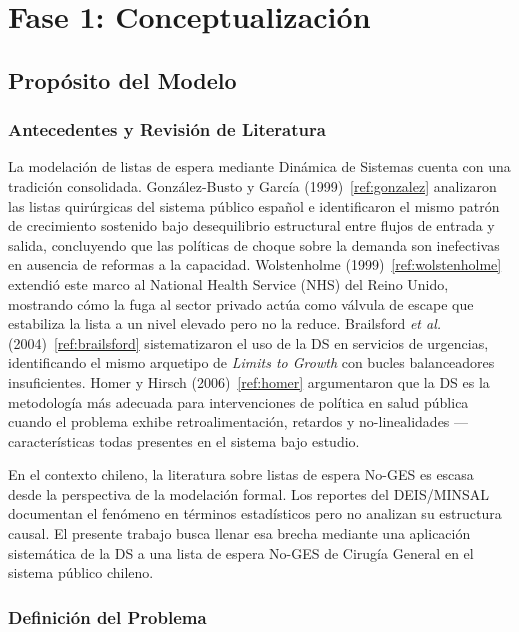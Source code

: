 \documentclass[12pt,a4paper]{article}
\begin{document}
\section{Fase 1: Conceptualización}

\subsection{Propósito del Modelo}

\subsubsection*{Antecedentes y Revisión de Literatura}

La modelación de listas de espera mediante Dinámica de Sistemas cuenta con una tradición consolidada. González-Busto y García (1999)~\ref{ref:gonzalez} analizaron las listas quirúrgicas del sistema público español e identificaron el mismo patrón de crecimiento sostenido bajo desequilibrio estructural entre flujos de entrada y salida, concluyendo que las políticas de choque sobre la demanda son inefectivas en ausencia de reformas a la capacidad. Wolstenholme (1999)~\ref{ref:wolstenholme} extendió este marco al National Health Service (NHS) del Reino Unido, mostrando cómo la fuga al sector privado actúa como válvula de escape que estabiliza la lista a un nivel elevado pero no la reduce. Brailsford \textit{et al.} (2004)~\ref{ref:brailsford} sistematizaron el uso de la DS en servicios de urgencias, identificando el mismo arquetipo de \textit{Limits to Growth} con bucles balanceadores insuficientes. Homer y Hirsch (2006)~\ref{ref:homer} argumentaron que la DS es la metodología más adecuada para intervenciones de política en salud pública cuando el problema exhibe retroalimentación, retardos y no-linealidades ---características todas presentes en el sistema bajo estudio.

En el contexto chileno, la literatura sobre listas de espera No-GES es escasa desde la perspectiva de la modelación formal. Los reportes del DEIS/MINSAL documentan el fenómeno en términos estadísticos pero no analizan su estructura causal. El presente trabajo busca llenar esa brecha mediante una aplicación sistemática de la DS a una lista de espera No-GES de Cirugía General en el sistema público chileno.

\subsubsection*{Definición del Problema}
\end{document}

